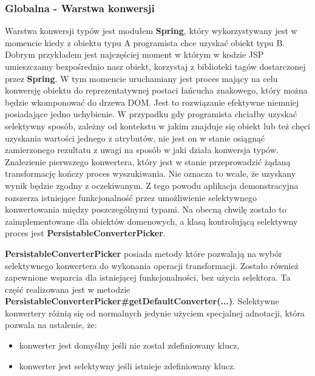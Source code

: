 		\subsubsection{Globalna - Warstwa konwersji}
			Warstwa konwersji typów jest modułem \textbf{Spring}, który wykorzystywany jest w momencie kiedy z obiektu typu
			A programista chce uzyskać obiekt typu B. Dobrym przykładem jest najczęściej moment w którym w kodzie JSP
			umieszczamy bezpośrednio nasz obiekt, korzystaj z biblioteki tagów dostarczonej przez \textbf{Spring}.
			W tym momencie uruchamiany jest proces mający na celu konwersję obiektu do reprezentatywnej postaci łańcucha znakowego,
			który można będzie wkomponować do drzewa DOM. 
			Jest to rozwiązanie efektywne niemniej posiadające jedno uchybienie. W przypadku gdy programista chciałby uzyskać
			selektywny sposób, zależny od kontekstu w jakim znajduje się obiekt lub też chęci uzyskania wartości
			jednego z atrybutów, nie jest on w stanie osiągnąć zamierzonego rezultatu z uwagi na sposób w jaki działa konwersja typów.
			Znalezienie pierwszego konwertera, który jest w stanie przeprowadzić żądaną transformację kończy proces wyszukiwania.
			Nie oznacza to wcale, że uzyskany wynik będzie zgodny z oczekiwanym. 
			Z tego powodu aplikacja demonstracyjna rozszerza istniejące funkcjonalność przez umożliwienie selektywnego
			konwertowania między poszczególnymi typami. Na obecną chwilę zostało to zaimplementowane dla obiektów domenowych, a
			klasą kontrolującą selektywny proces jest \textbf{PersistableConverterPicker}.
			\textbf{PersistableConverterPicker} posiada metody które pozwalają na wybór selektywnego konwertera do wykonania operacji
			transformacji. Zostało również zapewnione wsparcia dla istniejącej funkcjonalności, bez użycia selektora. Ta część realizowana jest w 
			metodzie \textbf{PersistableConverterPicker\#{}getDefaultConverter(...)}. Selektywne konwertery różnią się od normalnych jedynie
			użyciem specjalnej adnotacji, która pozwala na ustalenie, że:
			\begin{itemize}
				\item konwerter jest domyślny jeśli nie został zdefiniowany klucz,
				\item konwerter jest selektywny jeśli istnieje zdefiniowany klucz.
			\end{itemize}
		
